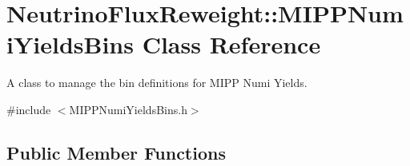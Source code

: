\hypertarget{class_neutrino_flux_reweight_1_1_m_i_p_p_numi_yields_bins}{\section{Neutrino\-Flux\-Reweight\-:\-:M\-I\-P\-P\-Numi\-Yields\-Bins Class Reference}
\label{class_neutrino_flux_reweight_1_1_m_i_p_p_numi_yields_bins}
}


A class to manage the bin definitions for M\-I\-P\-P Numi Yields.  




{\ttfamily \#include $<$M\-I\-P\-P\-Numi\-Yields\-Bins.\-h$>$}

\subsection*{Public Member Functions}

